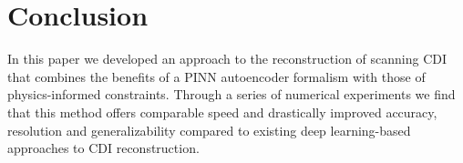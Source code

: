 \documentclass[sn-mathphys]{sn-jnl}%
\theoremstyle{thmstyleone}%
\theoremstyle{thmstyletwo}%
\theoremstyle{thmstylethree}%
\begin{document}



\section{Conclusion}
In this paper we developed an approach to the reconstruction of scanning CDI that combines the benefits of a PINN autoencoder formalism with those of physics-informed constraints. Through a series of numerical experiments we find that this method offers comparable speed and drastically improved accuracy, resolution and generalizability compared to existing deep learning-based approaches to CDI reconstruction. 
\end{document}
